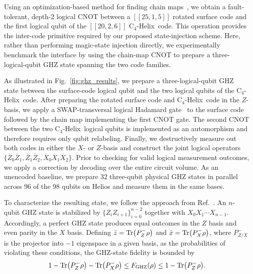 \documentclass[aps,prx,reprint,showpacs,twocolumn,superscriptaddress,eqsecnum]{revtex4-2}
\newcommand{\chelix}{C$_4$-Helix}
\begin{document}
Using an optimization-based method for finding chain maps~\cite{benhemou2026}, we obtain a fault-tolerant, depth-2 logical CNOT between a $[[25,1,5]]$ rotated surface code and the first logical qubit of the $[[20,2,6]]$ \chelix\ code. This operation provides the inter-code primitive required by our proposed state-injection scheme. Here, rather than performing magic-state injection directly, we experimentally benchmark the interface by using the chain-map CNOT to prepare a three-logical-qubit GHZ state spanning the two code families.

As illustrated in Fig.~\ref{fig:ghz_results}, we prepare a three-logical-qubit GHZ state between the surface-code logical qubit and the two logical qubits of the \chelix\ code. After preparing the rotated surface code and \chelix\ code in the $Z$-basis, we apply a SWAP-transversal logical Hadamard gate~\cite{chen2026} to the surface code followed by the chain map implementing the first CNOT gate. The second CNOT between the two \chelix\ logical qubits is implemented as an automorphism and therefore requires only qubit relabeling. Finally, we destructively measure out both codes in either the $X$- or $Z$-basis and construct the joint logical operators $\{\overline{Z}_0\overline{Z}_1, \overline{Z}_1 \overline{Z}_2, \overline{X}_0 \overline{X}_1\overline{X}_2\}$. Prior to checking for valid logical measurement outcomes, we apply a correction by decoding over the entire circuit volume. As an unencoded baseline, we prepare 32 three-qubit physical GHZ states in parallel across 96 of the 98 qubits on Helios and measure them in the same bases.

To characterize the resulting state, we follow the approach from Ref.~\cite{Hong_2024}. An $n$-qubit GHZ state is stabilized by
$\{Z_iZ_{i+1}\}_{i=0}^{n-2}$ together with
$X_0X_1\cdots X_{n-1}$. Accordingly, a perfect GHZ state produces equal outcomes in the $Z$ basis and even parity in the $X$ basis. Defining $\bar{z}=\Tr(P_Z^-\rho)$ and $\bar{x}=\Tr(P_X^-\rho)$, where $P^{-}_{Z/X}$ is the projector into $-1$ eigenspace in a given basis, as the probabilities of violating these conditions, the GHZ-state fidelity is bounded by
\begin{equation}
    1-\Tr(P_Z^- \rho) - \Tr(P_X^- \rho) \le F_{\rm{GHZ}}(\rho) \le 1- \Tr(P_Z^- \rho).
\end{equation}
\end{document}
